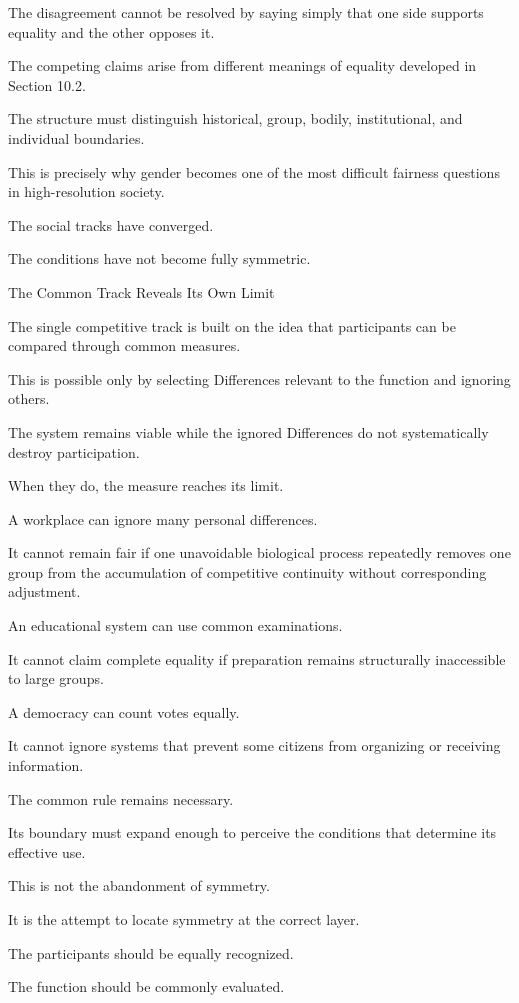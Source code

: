 The disagreement cannot be resolved by saying simply that one side supports equality and the other opposes it.

The competing claims arise from different meanings of equality developed in Section 10.2.

The structure must distinguish historical, group, bodily, institutional, and individual boundaries.

This is precisely why gender becomes one of the most difficult fairness questions in high-resolution society.

The social tracks have converged.

The conditions have not become fully symmetric.

The Common Track Reveals Its Own Limit

The single competitive track is built on the idea that participants can be compared through common measures.

This is possible only by selecting Differences relevant to the function and ignoring others.

The system remains viable while the ignored Differences do not systematically destroy participation.

When they do, the measure reaches its limit.

A workplace can ignore many personal differences.

It cannot remain fair if one unavoidable biological process repeatedly removes one group from the accumulation of competitive continuity without corresponding adjustment.

An educational system can use common examinations.

It cannot claim complete equality if preparation remains structurally inaccessible to large groups.

A democracy can count votes equally.

It cannot ignore systems that prevent some citizens from organizing or receiving information.

The common rule remains necessary.

Its boundary must expand enough to perceive the conditions that determine its effective use.

This is not the abandonment of symmetry.

It is the attempt to locate symmetry at the correct layer.

The participants should be equally recognized.

The function should be commonly evaluated.

